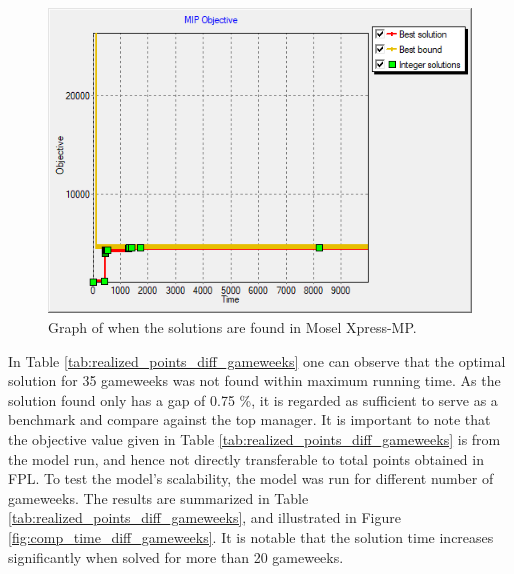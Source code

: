 \begin{figure}[H]
    \centering
    \includegraphics[scale=0.50]{fig/chapter_7/solution_found_edit_zoom_1.png}
    \caption{Graph of when the solutions are found in Mosel Xpress-MP.}
    \label{fig:solutions_found_realized_points}
\end{figure}

In Table \ref{tab:realized_points_diff_gameweeks} one can observe that the optimal solution for 35 gameweeks was not found within maximum running time. As the solution found only has a gap of 0.75 \%, it is regarded as sufficient to serve as a benchmark and compare against the top manager. It is important to note that the objective value given in Table \ref{tab:realized_points_diff_gameweeks} is from the model run, and hence not directly transferable to total points obtained in FPL. To test the model's scalability, the model was run for different number of gameweeks. The results are summarized in Table \ref{tab:realized_points_diff_gameweeks}, and illustrated in Figure \ref{fig:comp_time_diff_gameweeks}. It is notable that the solution time increases significantly when solved for more than 20 gameweeks. %


